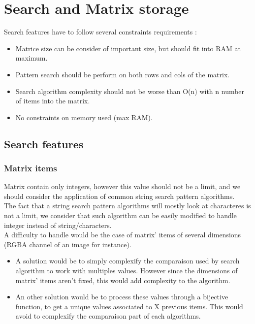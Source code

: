 \chapter{Search and Matrix storage}

\par
Search features have to follow several constraints requirements :
\begin{itemize}
	\item Matrice size can be consider of important size, but should fit into RAM at maximum.
	\item Pattern search should be perform on both rows and cols of the matrix.
	\item Search algorithm complexity should not be worse than O(n) with n number of items into the matrix.
	\item No constraints on memory used (max RAM).
\end{itemize}

\section{Search features}

\subsection{Matrix items}
Matrix contain only integers, however this value should not be a limit, and we should consider the application of common string search pattern algorithms.\\
The fact that a string search pattern algorithms will mostly look at characteres is not a limit, we consider that such algorithm can be easily modified to handle integer instead of string/characters.\\

A difficulty to handle would be the case of matrix' items of several dimensions (RGBA channel of an image for instance).
\begin{itemize}
	\item A solution would be to simply complexify the comparaison used by search algorithm to work with multiples values. However since the dimensions of matrix' items aren't fixed, this would add complexity to the algorithm. 
	\item An other solution would be to process these values through a bijective function, to get a unique values associated to X previous items. This would avoid to complexify the comparaison part of each algorithms.
\end{itemize}


